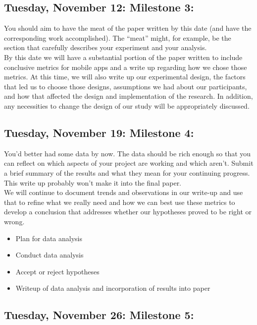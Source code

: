 \documentclass{article}
\begin{document}
\subsection{Tuesday, November 12: Milestone 3:}

You should aim to have the meat of the paper written by this date (and have the corresponding work accomplished). The “meat” might, for example, be the section that carefully describes your experiment and your analysis. \\

	By this date we will have a substantial portion of the paper written to include conclusive metrics for mobile apps and a write up regarding how we chose those metrics.  At this time, we will also write up our experimental design, the factors that led us to choose those designs, assumptions we had about our participants, and how that affected the design and implementation of the research. In addition, any necessities to change the design of our study will be appropriately discussed. \\

\subsection{Tuesday, November 19: Milestone 4:}

You’d better had some data by now. The data should be rich enough so that you can reflect on which aspects of your project are working and which aren't. Submit a brief summary of the results and what they mean for your continuing progress. This write up probably won’t make it into the final paper. \\

	We will continue to document trends and observations in our write-up and use that to refine what we really need and how we can best use these metrics to develop a conclusion that addresses whether our hypotheses proved to be right or wrong. \\

\begin{itemize}
\item Plan for data analysis 
\item Conduct data analysis
\item Accept or reject hypotheses
\item Writeup of data analysis and incorporation of results into paper 
\end{itemize}

\subsection{Tuesday, November 26: Milestone 5:}
\end{document}
